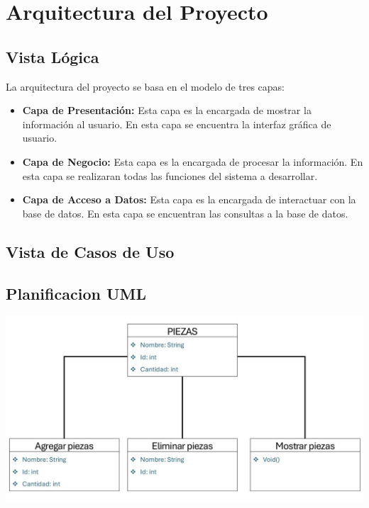 \section*{Arquitectura del Proyecto}

\subsection*{Vista Lógica}
La arquitectura del proyecto se basa en el modelo de tres capas: 
\begin{itemize}
    \item \textbf{Capa de Presentación:} Esta capa es la encargada de mostrar la información al usuario. 
    En esta capa se encuentra la interfaz gráfica de usuario.
    \item \textbf{Capa de Negocio:} Esta capa es la encargada de procesar la información. 
    En esta capa se realizaran todas las funciones del sistema a desarrollar.
    \item \textbf{Capa de Acceso a Datos:} Esta capa es la encargada de interactuar con la base de datos. 
    En esta capa se encuentran las consultas a la base de datos.
\end{itemize}

\subsection*{Vista de Casos de Uso}



\subsection*{Planificacion UML}


{\includegraphics[width=1\textwidth]{imag/UML.jpg}\par}